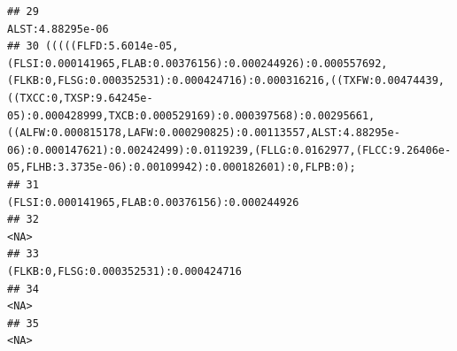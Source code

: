\documentclass[]{article}
\begin{document}
\begin{verbatim}
## 29                                                                                                                                                                                                                                                                                                                                                                                                                   ALST:4.88295e-06
## 30 (((((FLFD:5.6014e-05,(FLSI:0.000141965,FLAB:0.00376156):0.000244926):0.000557692,(FLKB:0,FLSG:0.000352531):0.000424716):0.000316216,((TXFW:0.00474439,((TXCC:0,TXSP:9.64245e-05):0.000428999,TXCB:0.000529169):0.000397568):0.00295661,((ALFW:0.000815178,LAFW:0.000290825):0.00113557,ALST:4.88295e-06):0.000147621):0.00242499):0.0119239,(FLLG:0.0162977,(FLCC:9.26406e-05,FLHB:3.3735e-06):0.00109942):0.000182601):0,FLPB:0);
## 31                                                                                                                                                                                                                                                                                                                                                                                     (FLSI:0.000141965,FLAB:0.00376156):0.000244926
## 32                                                                                                                                                                                                                                                                                                                                                                                                                               <NA>
## 33                                                                                                                                                                                                                                                                                                                                                                                              (FLKB:0,FLSG:0.000352531):0.000424716
## 34                                                                                                                                                                                                                                                                                                                                                                                                                               <NA>
## 35                                                                                                                                                                                                                                                                                                                                                                                                                               <NA>

\end{verbatim}
\end{document}
